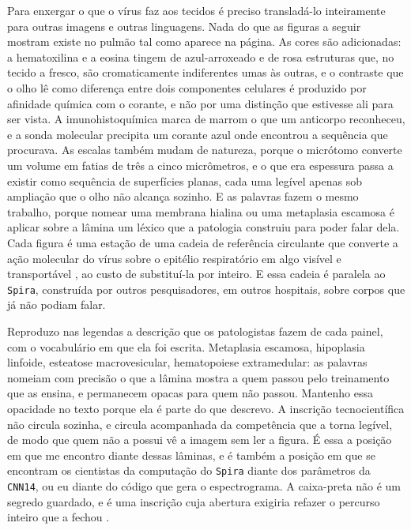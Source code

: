 Para enxergar o que o vírus faz aos tecidos é preciso transladá-lo inteiramente para outras imagens e outras linguagens. Nada do que as figuras a seguir mostram existe no pulmão tal como aparece na página. As cores são adicionadas: a hematoxilina e a eosina tingem de azul-arroxeado e de rosa estruturas que, no tecido a fresco, são cromaticamente indiferentes umas às outras, e o contraste que o olho lê como diferença entre dois componentes celulares é produzido por afinidade química com o corante, e não por uma distinção que estivesse ali para ser vista. A imunohistoquímica marca de marrom o que um anticorpo reconheceu, e a sonda molecular precipita um corante azul onde encontrou a sequência que procurava. As escalas também mudam de natureza, porque o micrótomo converte um volume em fatias de três a cinco micrômetros, e o que era espessura passa a existir como sequência de superfícies planas, cada uma legível apenas sob ampliação que o olho não alcança sozinho. E as palavras fazem o mesmo trabalho, porque nomear uma membrana hialina ou uma metaplasia escamosa é aplicar sobre a lâmina um léxico que a patologia construiu para poder falar dela. Cada figura é uma estação de uma cadeia de referência circulante que converte a ação molecular do vírus sobre o epitélio respiratório em algo visível e transportável \parencite{Latour1986Visualization}, ao custo de substituí-la por inteiro. E essa cadeia é paralela ao \texttt{Spira}, construída por outros pesquisadores, em outros hospitais, sobre corpos que já não podiam falar.

Reproduzo nas legendas a descrição que os patologistas fazem de cada painel, com o vocabulário em que ela foi escrita. Metaplasia escamosa, hipoplasia linfoide, esteatose macrovesicular, hematopoiese extramedular: as palavras nomeiam com precisão o que a lâmina mostra a quem passou pelo treinamento que as ensina, e permanecem opacas para quem não passou. Mantenho essa opacidade no texto porque ela é parte do que descrevo. A inscrição tecnocientífica não circula sozinha, e circula acompanhada da competência que a torna legível, de modo que quem não a possui vê a imagem sem ler a figura. É essa a posição em que me encontro diante dessas lâminas, e é também a posição em que se encontram os cientistas da computação do \texttt{Spira} diante dos parâmetros da \texttt{\texttt{CNN14}}, ou eu diante do código que gera o espectrograma. A caixa-preta não é um segredo guardado, e é uma inscrição cuja abertura exigiria refazer o percurso inteiro que a fechou \parencite{Latour2011CienciaEmAcao}.

